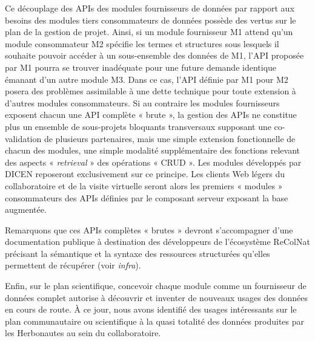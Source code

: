 Ce découplage des APIs des modules fournisseurs de données par rapport aux besoins des modules tiers consommateurs de données possède des vertus sur le plan de la gestion de projet.
Ainsi, si un module fournisseur M1 attend qu'un module consommateur M2 spécifie les termes et structures sous lesquels il souhaite pouvoir accéder à un sous-ensemble des données de M1, l'API proposée par M1 pourra se trouver inadéquate pour une future demande identique émanant d'un autre module M3.
Dans ce cas, l'API définie par M1 pour M2 posera des problèmes assimilable à une dette technique pour toute extension à d'autres modules consommateurs.
Si au contraire les modules fournisseurs exposent chacun une API complète « brute », la gestion des APIs ne constitue plus un ensemble de sous-projets bloquants transversaux supposant une co-validation de plusieurs partenaires, mais une simple extension fonctionnelle de chacun des modules, une simple modalité supplémentaire des fonctions relevant des aspects « {\it retrieval} » des opérations « CRUD ».
Les modules développés par DICEN reposeront exclusivement sur ce principe.
Les clients Web légers du collaboratoire et de la visite virtuelle seront alors les premiers « modules » consommateurs des APIs définies par le composant serveur exposant la base augmentée.

Remarquons que ces APIs complètes « brutes » devront s'accompagner d'une documentation publique à destination des développeurs de l'écosystème ReColNat précisant la sémantique et la syntaxe des ressources structurées qu'elles permettent de récupérer (voir {\it infra}).

Enfin, sur le plan scientifique, concevoir chaque module comme un fournisseur de données complet autorise à découvrir et inventer de nouveaux usages des données en cours de route.
À ce jour, nous avons identifié des usages intéressants sur le plan communautaire ou scientifique à la quasi totalité des données produites par les Herbonautes au sein du collaboratoire.
